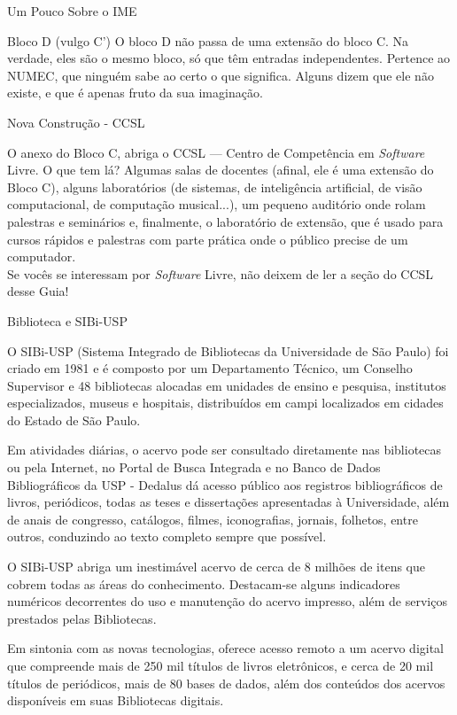 \begin{secao}{Um Pouco Sobre o IME}
\begin{subsecao}{Bloco D (vulgo C')}
O bloco D não passa de uma extensão do bloco C. Na verdade, eles são o mesmo bloco,
só que têm entradas independentes. Pertence ao NUMEC, que ninguém sabe ao certo
o que significa. Alguns dizem que ele não existe, e que é apenas fruto da sua
imaginação.

\end{subsecao}

\begin{subsecao}{Nova Construção - CCSL}

O anexo do Bloco C, abriga o CCSL --- Centro de Competência em \textit{Software} 
Livre. O que tem lá? Algumas salas de docentes (afinal, ele é uma extensão do 
Bloco C), alguns laboratórios (de sistemas, de inteligência artificial, 
de visão computacional, de computação musical...), um pequeno auditório 
onde rolam palestras e seminários e, finalmente, o laboratório de extensão, 
que é usado para cursos rápidos e palestras com parte prática onde o público 
precise de um computador.\\
Se vocês se interessam por \textit{Software} Livre, não deixem de ler a seção 
do CCSL desse Guia!

\end{subsecao}

\begin{subsecao}{Biblioteca e SIBi-USP}

O SIBi-USP (Sistema Integrado de Bibliotecas da Universidade de São Paulo) foi
criado em 1981 e é composto por um Departamento Técnico, um Conselho Supervisor
e 48 bibliotecas alocadas em unidades de ensino e pesquisa, institutos
especializados, museus e hospitais, distribuídos em campi localizados em
cidades do Estado de São Paulo.

Em atividades diárias, o acervo pode ser consultado diretamente nas bibliotecas
ou pela Internet, no Portal de Busca Integrada e no Banco de Dados
Bibliográficos da USP - Dedalus dá acesso público aos registros bibliográficos
de livros, periódicos, todas as teses e dissertações apresentadas à
Universidade, além de anais de congresso, catálogos, filmes, iconografias,
jornais, folhetos, entre outros, conduzindo ao texto completo sempre que
possível.

O SIBi-USP abriga um inestimável acervo de cerca de 8 milhões de itens que
cobrem todas as áreas do conhecimento. Destacam-se alguns indicadores numéricos
decorrentes do uso e manutenção do acervo impresso, além de serviços prestados
pelas Bibliotecas.

Em sintonia com as novas tecnologias, oferece acesso remoto a um acervo digital
que compreende mais de 250 mil títulos de livros eletrônicos, e cerca de 20 mil
títulos de periódicos, mais de 80 bases de dados, além dos conteúdos dos acervos
disponíveis em suas Bibliotecas digitais.


\end{subsecao}
\end{secao}

